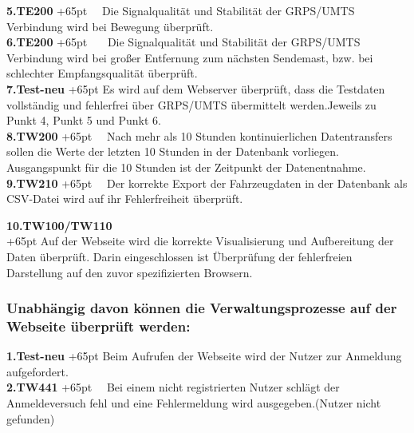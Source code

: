 \documentclass[fontsize = 12pt, paper = a4]{scrreprt}
\begin{document}
\textbf{5.TE200}
\hangindent+65pt  
\ \ Die Signalqualität und Stabilität der GRPS/UMTS Verbindung wird bei Bewegung überprüft.\\

\textbf{6.TE200}
\hangindent+65pt  
\ \ \  Die Signalqualität und Stabilität der GRPS/UMTS Verbindung wird bei großer Entfernung zum nächsten Sendemast, bzw. bei schlechter Empfangsqualität überprüft.\\

\textbf{7.Test-neu}
\hangindent+65pt 
 Es wird auf dem Webserver überprüft, dass die Testdaten vollständig und fehlerfrei über GRPS/UMTS übermittelt werden.Jeweils zu Punkt 4, Punkt 5 und Punkt 6.\\
 
\textbf{8.TW200}
\hangindent+65pt 
\ \  Nach mehr als 10 Stunden kontinuierlichen Datentransfers sollen die Werte der letzten 10 Stunden in der Datenbank vorliegen. Ausgangspunkt für die 10 Stunden ist der Zeitpunkt der Datenentnahme.\\
 
\textbf{9.TW210}
\hangindent+65pt 
\ \ Der korrekte Export der Fahrzeugdaten in der Datenbank als CSV-Datei wird auf ihr Fehlerfreiheit überprüft.\\

\newpage

\textbf{10.TW100/TW110}\\
\hangindent+65pt 
Auf der Webseite wird die korrekte Visualisierung und Aufbereitung der Daten überprüft. Darin eingeschlossen ist Überprüfung der fehlerfreien Darstellung auf den zuvor spezifizierten Browsern. \\




\subsubsection*{Unabhängig davon können die Verwaltungsprozesse auf der Webseite überprüft werden:}


\textbf{1.Test-neu}
\hangindent+65pt 
Beim Aufrufen der Webseite wird der Nutzer zur Anmeldung aufgefordert.\\

\textbf{2.TW441}
\hangindent+65pt 
\ \ Bei einem nicht registrierten Nutzer schlägt der Anmeldeversuch fehl und eine Fehlermeldung wird ausgegeben.(Nutzer nicht gefunden) \\
\end{document}
